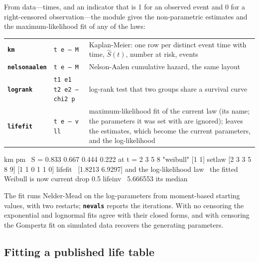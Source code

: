 \documentclass[11pt,letterpaper]{article}
\newcommand{\cmd}[1]{\texttt{\textbf{#1}}}
\newcommand{\stk}[1]{\texttt{#1}}
\begin{document}
From data---times, and an indicator that is 1 for an observed event and 0 for a right-censored observation---the module gives the non-parametric estimates and the maximum-likelihood fit of any of the laws:
\begin{center}
\begin{tabular}{@{}l>{\raggedright\arraybackslash}p{}>{\raggedright\arraybackslash}p{}@{}}
\toprule
\cmd{km} & \stk{t e -- M} & Kaplan-Meier: one row per distinct event time with time, $\hat S(t)$, number at risk, events \\
\cmd{nelsonaalen} & \stk{t e -- M} & Nelson-Aalen cumulative hazard, the same layout \\
\cmd{logrank} & \stk{t1 e1 t2 e2 -- chi2 p} & log-rank test that two groups share a survival curve \\
\cmd{lifefit} & \stk{t e -- v ll} & maximum-likelihood fit of the current law (its name; the parameters it was set with are ignored); leaves the estimates, which become the current parameters, and the log-likelihood \\
\bottomrule
\end{tabular}
\end{center}
\begin{rpn}
[2 3 3 5 8 9] [1 1 0 1 1 0] km pm        \ S = 0.833 0.667 0.444 0.222 at t = 2 3 5 8
"weibull" [1 1] setlaw
[2 3 3 5 8 9] [1 1 0 1 1 0] lifefit      \ [1.8213 6.9297] and the log-likelihood
law                                      \ the fitted Weibull is now current
drop 0.5 lifeinv                         \ 5.666553   its median
\end{rpn}
The fit runs Nelder-Mead on the log-parameters from moment-based starting values, with two restarts; \cmd{nevals} reports the iterations. With no censoring the exponential and lognormal fits agree with their closed forms, and with censoring the Gompertz fit on simulated data recovers the generating parameters.

\subsection{Fitting a published life table}
\end{document}
